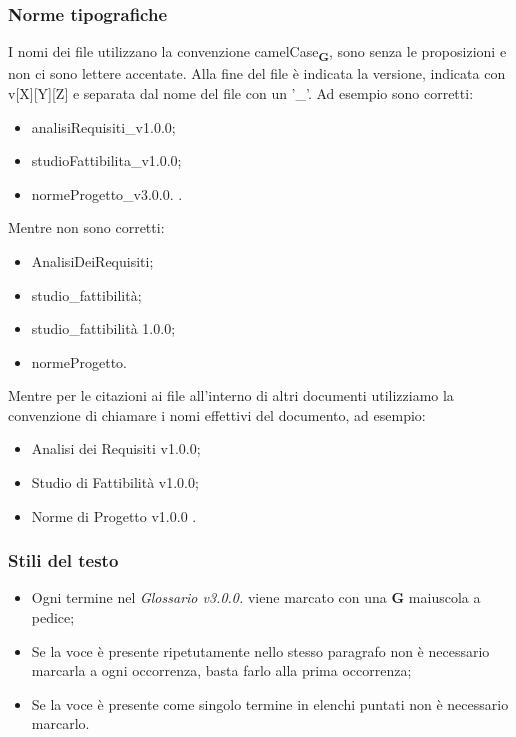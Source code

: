 \subsubsection{Norme tipografiche}
I nomi dei file utilizzano la convenzione camelCase\textsubscript{\textbf{G}}, sono senza le proposizioni e non ci sono lettere accentate.
Alla fine del file è indicata la versione, indicata con v[X][Y][Z] e separata dal nome del file con un '\_'.
Ad esempio sono corretti:
\begin{itemize}
    \item analisiRequisiti\_v1.0.0;
    \item studioFattibilita\_v1.0.0;
    \item normeProgetto\_v3.0.0. .
\end{itemize}
Mentre non sono corretti:
\begin{itemize}
    \item AnalisiDeiRequisiti;
    \item studio\_fattibilità;
    \item studio\_fattibilità 1.0.0;
    \item normeProgetto.
\end{itemize}

Mentre per le citazioni ai file all'interno di altri documenti utilizziamo la convenzione di chiamare i nomi effettivi del documento, ad esempio:
\begin{itemize}
    \item Analisi dei Requisiti v1.0.0;
    \item Studio di Fattibilità v1.0.0;
    \item Norme di Progetto v1.0.0 .
\end{itemize}

\subsubsection{Stili del testo}

\begin{itemize}
    \item Ogni termine nel \textit{Glossario v3.0.0.} viene marcato con una \textbf{G} maiuscola a pedice;
    \item Se la voce è presente ripetutamente nello stesso paragrafo non è necessario marcarla a ogni occorrenza, basta farlo alla prima occorrenza;
    \item Se la voce è presente come singolo termine in elenchi puntati non è necessario marcarlo.
\end{itemize}

